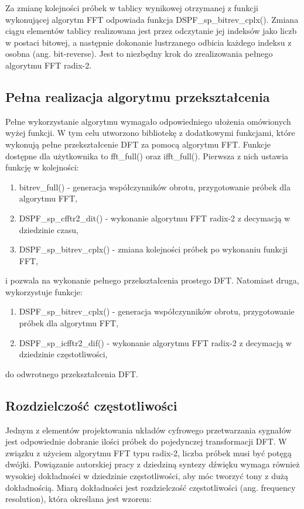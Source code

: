 Za zmianę kolejności próbek w tablicy wynikowej otrzymanej z funkcji wykonującej algorytm FFT odpowiada funkcja DSPF\_sp\_bitrev\_cplx(). Zmiana ciągu elementów tablicy realizowana jest przez odczytanie jej indeksów jako liczb w postaci bitowej, a następnie dokonanie lustrzanego odbicia każdego indeksu z osobna (ang. bit-reverse). Jest to niezbędny krok do zrealizowania pełnego algorytmu FFT radix-2.

\subsection{Pełna realizacja algorytmu przekształcenia}
Pełne wykorzystanie algorytmu wymagało odpowiedniego ułożenia omówionych wyżej funkcji. W tym celu utworzono bibliotekę z dodatkowymi funkcjami, które wykonują pełne przekształcenie DFT za pomocą algorytmu FFT. Funkcje dostępne dla użytkownika to fft\_full() oraz ifft\_full(). Pierwsza z nich ustawia funkcję w kolejności:
\begin{enumerate}
	\item bitrev\_full() - generacja współczynników obrotu, przygotowanie próbek dla algorytmu FFT,
	\item DSPF\_sp\_cfftr2\_dit() - wykonanie algorytmu FFT radix-2 z decymacją w dziedzinie czasu,
	\item DSPF\_sp\_bitrev\_cplx() - zmiana kolejności próbek po wykonaniu funkcji FFT,
\end{enumerate}
i pozwala na wykonanie pełnego przekształcenia prostego DFT. Natomiast druga, wykorzystuje funkcje:
\begin{enumerate}
	\item DSPF\_sp\_bitrev\_cplx() - generacja współczynników obrotu, przygotowanie próbek dla algorytmu FFT,
	\item DSPF\_sp\_icfftr2\_dif() - wykonanie algorytmu FFT radix-2 z decymacją w dziedzinie częstotliwości,
\end{enumerate}
do odwrotnego przekształcenia DFT.

\subsection{Rozdzielczość częstotliwości}
Jednym z elementów projektowania układów cyfrowego przetwarzania sygnałów jest odpowiednie dobranie ilości próbek do pojedynczej transformacji DFT. W związku z użyciem algorytmu FFT typu radix-2, liczba próbek musi być potęgą dwójki. Powiązanie autorskiej pracy z dziedziną syntezy dźwięku wymaga również wysokiej dokładności w dziedzinie częstotliwości, aby móc tworzyć tony z dużą dokładnością. Miarą dokładności jest rozdzielczość częstotliwości (ang. frequency resolution), która określana jest wzorem:

